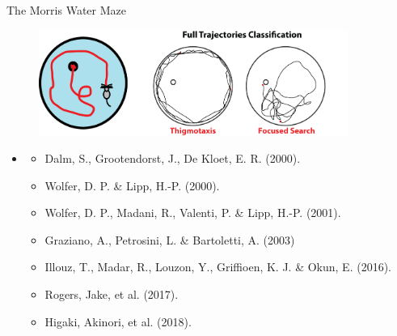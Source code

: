 \documentclass{beamer}
\newlength{\tmpShadow}
\newcommand{\MyShadow}[2]{%
	\settowidth{\tmpShadow}{#1}
	\addtolength{\tmpShadow}{.1em}
	\raisebox{-0.25ex}{\textcolor{gray!70}{#1}}%
	\kern-\tmpShadow%
	\textcolor{#2}{#1}%
}
\begin{document}
{\begin{frame}{The Morris Water Maze}
\begin{figure}[H]
	\centering
	\includegraphics[width=0.9\textwidth]{figures/MWMothers}
\end{figure}	
\begin{multicols}{2}
	\small{
	\begin{itemize}[leftmargin=*]			
		\item
		\begin{itemize}[label={\MyShadow{$\bullet$}{blue!80}}]
			\item Dalm, S., Grootendorst, J., De Kloet, E. R. (2000).
			\vspace{1.2mm}	
			\item Wolfer, D. P. \& Lipp, H.-P. (2000).
			\vspace{1.2mm}
			\item Wolfer, D. P., Madani, R., Valenti, P. \& Lipp, H.-P. (2001).
			\vspace{1.2mm}
			\item Graziano, A., Petrosini, L. \& Bartoletti, A. (2003)
			\vspace{1.2mm}
			\item Illouz, T., Madar, R., Louzon, Y., Griffioen, K. J. \& Okun, E. (2016).
			\vspace{1.2mm}
			\item Rogers, Jake, et al. (2017).
			\vspace{1.2mm}
			\item Higaki, Akinori, et al. (2018).
		\end{itemize}		
	\end{itemize}
	}
\end{multicols}	
\end{frame}


}
\end{document}
